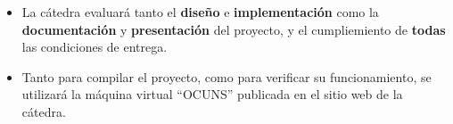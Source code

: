 \documentclass[12pt,a4paper]{article}
\begin{document}
\begin{itemize}
	
	\item La cátedra evaluará tanto el \textbf{diseño} e \textbf{implementación}
	como la \textbf{documentación} y \textbf{presentación} del proyecto, y el cumpliemiento de \textbf{todas} las condiciones de entrega.
	
	\item Tanto para compilar el proyecto, como para verificar su funcionamiento, se utilizará la máquina virtual “OCUNS” publicada en el sitio web de la cátedra.
	
\end{itemize}
\end{document}
